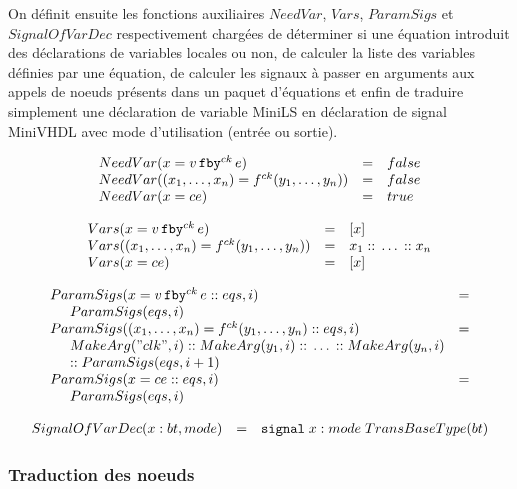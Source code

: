 \documentclass[a4paper]{article}
\newcommand{\minils}{{\sc MiniLS}}
\newcommand{\minivhdl}{{\sc MiniVHDL}}
\newcommand{\mybox}[1]{\mbox{\tt{#1}}}
\newcommand{\ind}[0]{\hspace{0.5cm}}
\newcommand{\Cons}[0]{\; \mathbf{::} \;}
\newcommand{\Fby}[2]{#1 \, \mybox{fby}^{ck} \, #2}
\newcommand{\App}[2]{#1^{ck}(#2)}
\begin{document}
On définit ensuite les fonctions auxiliaires $NeedVar$, $Vars$, $ParamSigs$ et
$SignalOfVarDec$ respectivement chargées de déterminer si une équation introduit
des déclarations de variables locales ou non, de calculer la liste des variables
définies par une équation, de calculer les signaux à passer en arguments aux
appels de noeuds présents dans un paquet d'équations et enfin de traduire
simplement une déclaration de variable \minils{} en déclaration de signal \minivhdl{}
avec mode d'utilisation (entrée ou sortie).

\newcommand{\NV}[1]{NeedVar(#1)}
\newcommand{\V}[1]{Vars(#1)}
\newcommand{\PS}[2]{ParamSigs(#1,#2)}
\newcommand{\SoVD}[3]{SignalOfVarDec(#1 : #2, #3)}

\[
\begin{array}{lcl}
  \NV{x = \Fby{v}{e}} & = & false \\
  \NV{(x_1,\dots,x_n) = \App{f}{y_1,\dots,y_n}} & = & false \\
  \NV{x = ce} & = & true
\end{array}
\]

\[
\begin{array}{lcl}
  \V{x = \Fby{v}{e}} & = & [x] \\
  \V{(x_1,\dots,x_n) = \App{f}{y_1,\dots,y_n}} & = & x_1 \Cons \dots \Cons x_n \\
  \V{x = ce} & = & [x]
\end{array}
\]

\[
\begin{array}{ll}
  \PS{x = \Fby{v}{e} \Cons eqs}{i} & = \\
  \ind \PS{eqs}{i} \\
  \PS{(x_1,\dots,x_n) = \App{f}{y_1,\dots,y_n} \Cons eqs}{i} & = \\
  \ind \MA{"clk"}{i} \Cons \MA{y_1}{i} \Cons \dots \Cons \MA{y_n}{i} \\
  \ind \mathtt{::} \; \PS{eqs}{i + 1}
  \\
  \PS{x = ce \Cons eqs}{i} & = \\
  \ind \PS{eqs}{i}
\end{array}
\]

\[
\begin{array}[lcl]{lcl}
  \SoVD{x}{bt}{mode} & = & \mybox{signal} \; x : mode \; TransBaseType(bt)
\end{array}
\]

\subsubsection{Traduction des noeuds}
\end{document}
